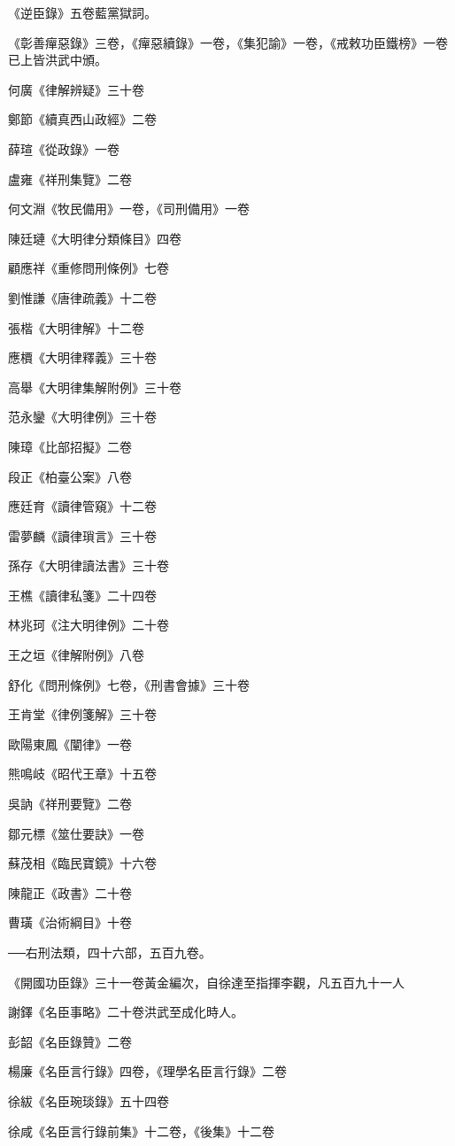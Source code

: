 《逆臣錄》五卷藍黨獄詞。

《彰善癉惡錄》三卷，《癉惡續錄》一卷，《集犯諭》一卷，《戒敕功臣鐵榜》一卷已上皆洪武中頒。

何廣《律解辨疑》三十卷

鄭節《續真西山政經》二卷

薛瑄《從政錄》一卷

盧雍《祥刑集覽》二卷

何文淵《牧民備用》一卷，《司刑備用》一卷

陳廷璉《大明律分類條目》四卷

顧應祥《重修問刑條例》七卷

劉惟謙《唐律疏義》十二卷

張楷《大明律解》十二卷

應檟《大明律釋義》三十卷

高舉《大明律集解附例》三十卷

范永鑾《大明律例》三十卷

陳璋《比部招擬》二卷

段正《柏臺公案》八卷

應廷育《讀律管窺》十二卷

雷夢麟《讀律瑣言》三十卷

孫存《大明律讀法書》三十卷

王樵《讀律私箋》二十四卷

林兆珂《注大明律例》二十卷

王之垣《律解附例》八卷

舒化《問刑條例》七卷，《刑書會據》三十卷

王肯堂《律例箋解》三十卷

歐陽東鳳《闡律》一卷

熊鳴岐《昭代王章》十五卷

吳訥《祥刑要覽》二卷

鄒元標《筮仕要訣》一卷

蘇茂相《臨民寶鏡》十六卷

陳龍正《政書》二十卷

曹璜《治術綱目》十卷

──右刑法類，四十六部，五百九卷。

《開國功臣錄》三十一卷黃金編次，自徐達至指揮李觀，凡五百九十一人

謝鐸《名臣事略》二十卷洪武至成化時人。

彭韶《名臣錄贊》二卷

楊廉《名臣言行錄》四卷，《理學名臣言行錄》二卷

徐紱《名臣琬琰錄》五十四卷

徐咸《名臣言行錄前集》十二卷，《後集》十二卷

